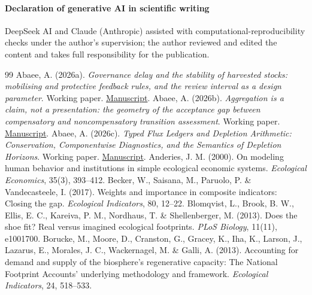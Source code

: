 \documentclass[preprint,12pt,authoryear]{elsarticle}
\begin{document}
\paragraph{Declaration of generative AI in scientific writing} DeepSeek AI and Claude (Anthropic) assisted with computational-reproducibility checks under the author's supervision; the author reviewed and edited the content and takes full responsibility for the publication.
\begin{thebibliography}{99}
 Abaee, A. (2026a). \emph{Governance delay and the stability of harvested stocks: mobilising and protective feedback rules, and the review interval as a design parameter}. Working paper. \href{https://github.com/MIKEAA2020/general-sustainability/blob/2efaa62083f2007dec3446c15c475af88f0925f3/arena%20agent%201/paper%20rewrites/latex/paper4_delay_dynamics_v41.pdf}{Manuscript}.
 Abaee, A. (2026b). \emph{Aggregation is a claim, not a presentation: the geometry of the acceptance gap between compensatory and noncompensatory transition assessment}. Working paper. \href{https://github.com/MIKEAA2020/general-sustainability/blob/2efaa62083f2007dec3446c15c475af88f0925f3/arena%20agent%201/paper%20rewrites/latex/paper06_assessment_separation_v71.pdf}{Manuscript}.
 Abaee, A. (2026c). \emph{Typed Flux Ledgers and Depletion Arithmetic: Conservation, Componentwise Diagnostics, and the Semantics of Depletion Horizons}. Working paper. \href{https://github.com/MIKEAA2020/general-sustainability/blob/2efaa62083f2007dec3446c15c475af88f0925f3/paper3/latest-2026-09-19/manuscript/paper3_material_ledgers_v50.pdf}{Manuscript}.
 Anderies, J. M. (2000). On modeling human behavior and institutions in simple ecological economic systems. \emph{Ecological Economics}, 35(3), 393--412.
 Becker, W., Saisana, M., Paruolo, P. \& Vandecasteele, I. (2017). Weights and importance in composite indicators: Closing the gap. \emph{Ecological Indicators}, 80, 12--22.
 Blomqvist, L., Brook, B. W., Ellis, E. C., Kareiva, P. M., Nordhaus, T. \& Shellenberger, M. (2013). Does the shoe fit? Real versus imagined ecological footprints. \emph{PLoS Biology}, 11(11), e1001700.
 Borucke, M., Moore, D., Cranston, G., Gracey, K., Iha, K., Larson, J., Lazarus, E., Morales, J. C., Wackernagel, M. \& Galli, A. (2013). Accounting for demand and supply of the biosphere's regenerative capacity: The National Footprint Accounts' underlying methodology and framework. \emph{Ecological Indicators}, 24, 518--533.

\end{thebibliography}
\end{document}
